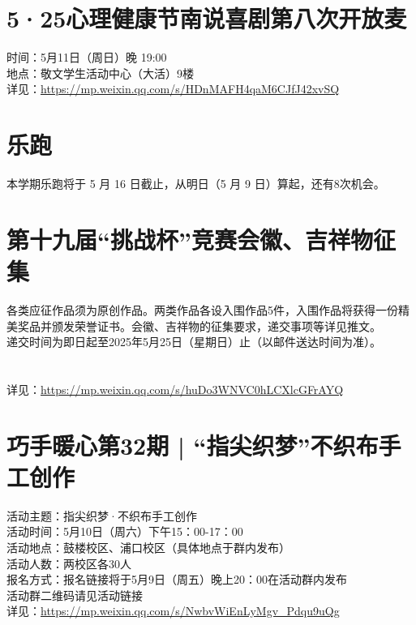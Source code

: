 \documentclass[letterpaper, 12pt]{article}
\begin{document}
\begin{multicols}{2}
\section{5·25心理健康节南说喜剧第八次开放麦} %
时间：5月11日（周日）晚 19:00
\\地点：敬文学生活动中心（大活）9楼
\\详见：\url{https://mp.weixin.qq.com/s/HDnMAFH4qaM6CJfJ42xvSQ}

\section{乐跑} %
本学期乐跑将于 5 月 16 日截止，从明日（5 月 9 日）算起，还有8次机会。

\section{第十九届“挑战杯”竞赛会徽、吉祥物征集} %
各类应征作品须为原创作品。两类作品各设入围作品5件，入围作品将获得一份精美奖品并颁发荣誉证书。会徽、吉祥物的征集要求，递交事项等详见推文。
\\递交时间为即日起至2025年5月25日（星期日）止（以邮件送达时间为准）。
\\
\\
\\详见：\url{https://mp.weixin.qq.com/s/huDo3WNVC0hLCXlcGFrAYQ}

\section{巧手暖心第32期 | “指尖织梦”不织布手工创作} %
活动主题：指尖织梦·不织布手工创作
\\活动时间：5月10日（周六）下午15：00-17：00 
\\活动地点：鼓楼校区、浦口校区（具体地点于群内发布）
\\活动人数：两校区各30人
\\报名方式：报名链接将于5月9日（周五）晚上20：00在活动群内发布
\\活动群二维码请见活动链接
\\详见：\url{https://mp.weixin.qq.com/s/NwbvWiEnLyMgv_Pdqu9uQg}


\end{multicols}
\end{document}

